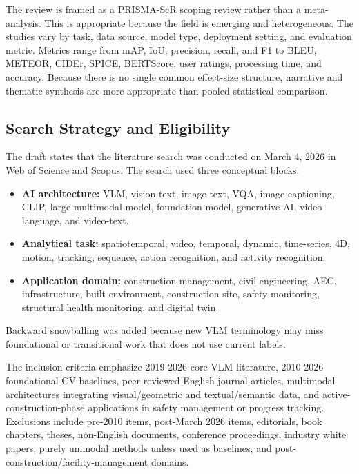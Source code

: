 \documentclass[10pt,letterpaper]{article}
\begin{document}
The review is framed as a PRISMA-ScR scoping review rather than a meta-analysis. This is appropriate because the field is emerging and heterogeneous. The studies vary by task, data source, model type, deployment setting, and evaluation metric. Metrics range from mAP, IoU, precision, recall, and F1 to BLEU, METEOR, CIDEr, SPICE, BERTScore, user ratings, processing time, and accuracy. Because there is no single common effect-size structure, narrative and thematic synthesis are more appropriate than pooled statistical comparison.

\subsection{Search Strategy and Eligibility}

The draft states that the literature search was conducted on March 4, 2026 in Web of Science and Scopus. The search used three conceptual blocks:

\begin{itemize}
\item \textbf{AI architecture:} VLM, vision-text, image-text, VQA, image captioning, CLIP, large multimodal model, foundation model, generative AI, video-language, and video-text.
\item \textbf{Analytical task:} spatiotemporal, video, temporal, dynamic, time-series, 4D, motion, tracking, sequence, action recognition, and activity recognition.
\item \textbf{Application domain:} construction management, civil engineering, AEC, infrastructure, built environment, construction site, safety monitoring, structural health monitoring, and digital twin.
\end{itemize}

Backward snowballing was added because new VLM terminology may miss foundational or transitional work that does not use current labels.

The inclusion criteria emphasize 2019-2026 core VLM literature, 2010-2026 foundational CV baselines, peer-reviewed English journal articles, multimodal architectures integrating visual/geometric and textual/semantic data, and active-construction-phase applications in safety management or progress tracking. Exclusions include pre-2010 items, post-March 2026 items, editorials, book chapters, theses, non-English documents, conference proceedings, industry white papers, purely unimodal methods unless used as baselines, and post-construction/facility-management domains.
\end{document}

